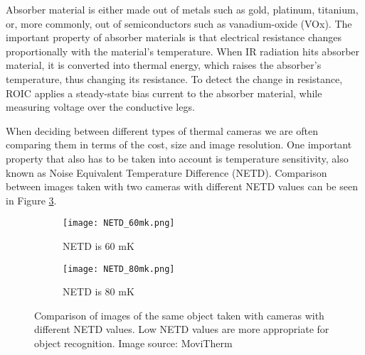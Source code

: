 Absorber material is either made out of metals such as gold, platinum, titanium, or, more commonly, out of semiconductors such as vanadium-oxide (VOx)\cite{thermal_article}.
The important property of absorber materials is that electrical resistance changes proportionally with the material's temperature\cite{thermal_book}.
When IR radiation hits absorber material, it is converted into thermal energy, which raises the absorber's temperature, thus changing its resistance.
To detect the change in resistance, ROIC applies a steady-state bias current to the absorber material, while measuring voltage over the conductive legs\cite{thermal_book}. 

When deciding between different types of thermal cameras we are often comparing them in terms of the cost, size and image resolution.
One important property that also has to be taken into account is temperature sensitivity, also known as Noise Equivalent Temperature Difference (NETD).
Comparison between images taken with two cameras with different NETD values can be seen in Figure \ref{NETD}.
\newline
\begin{figure}[ht]
    \begin{subfigure}{0.5\textwidth}
        \centering
        \texttt{[image: NETD\_60mk.png]} 
        \caption{NETD is 60 \si{\milli\kelvin}}
        \label{NETD_60mk}
    \end{subfigure}
    \begin{subfigure}{0.5\textwidth}
        \centering
        \texttt{[image: NETD\_80mk.png]}
        \caption{NETD is 80 \si{\milli\kelvin}}
        \label{NETD_80mk}
    \end{subfigure}
    \caption[Comparison of images of the same object taken with cameras with different NETD values.]{Comparison of images of the same object taken with cameras with different NETD values. Low NETD values are more appropriate for object recognition. Image source: MoviTherm \cite{NETD}}
    \label{NETD}
\end{figure}

